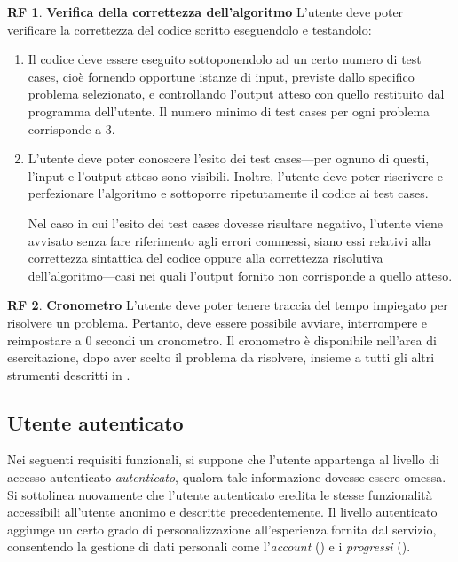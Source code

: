 \documentclass[11pt, a4paper]{article}
\theoremstyle{definition}
\newtheorem{funcreq}{RF} %
\begin{document}
\begin{funcreq}
\label{test}
\textbf{Verifica della correttezza dell'algoritmo }
L'utente deve poter verificare la correttezza del codice scritto eseguendolo
e testandolo:
\begin{enumerate}
    \item Il codice deve essere eseguito sottoponendolo ad un certo numero
    di test cases, cioè fornendo opportune istanze di input, previste dallo
    specifico problema selezionato, e controllando l'output atteso con quello
    restituito dal programma dell'utente.
    Il numero minimo di test cases per ogni problema corrisponde a 3.

    \item L'utente deve poter conoscere l'esito dei test cases—per ognuno
    di questi, l'input e l'output atteso sono visibili. Inoltre, l'utente
    deve poter riscrivere e perfezionare l'algoritmo e sottoporre ripetutamente
    il codice ai test cases.

    Nel caso in cui l'esito dei test cases dovesse risultare negativo, l'utente
    viene avvisato senza fare riferimento agli errori commessi, siano essi
    relativi alla correttezza sintattica del codice oppure alla
    correttezza risolutiva dell'algoritmo—casi nei quali l'output fornito
    non corrisponde a quello atteso.
\end{enumerate}
\end{funcreq}

\begin{funcreq}
    \label{chrono}
    \textbf{Cronometro }
    L'utente deve poter tenere traccia del tempo impiegato per risolvere un problema.
    Pertanto, deve essere possibile avviare, interrompere e reimpostare a 0 secondi un
    cronometro. Il cronometro è disponibile nell'area di esercitazione, dopo aver scelto
    il problema da risolvere, insieme a tutti gli altri strumenti descritti in
    \textcolor{blue}{}.
\end{funcreq}

\newpage
\begin{center}
    \section*{Utente autenticato}
\end{center}

Nei seguenti requisiti funzionali, si suppone che l'utente appartenga al livello
di accesso autenticato \textit{autenticato}, qualora tale informazione dovesse essere omessa.
Si sottolinea nuovamente che l'utente autenticato eredita le stesse funzionalità
accessibili all'utente anonimo e descritte precedentemente.
Il livello autenticato aggiunge un certo grado di personalizzazione all'esperienza
fornita dal servizio, consentendo la gestione di dati personali come
l'\textit{account} (\textcolor{blue}{}) e i
\textit{progressi} (\textcolor{blue}{}).
\\
\end{document}
